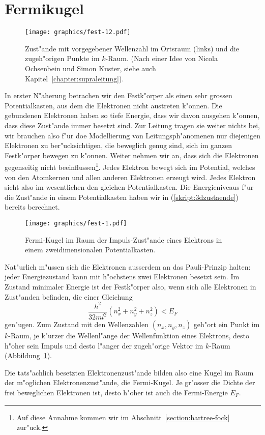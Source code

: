 \section{Fermikugel}
\begin{figure}
\centering
\texttt{[image: graphics/fest-12.pdf]}
\caption{Zust"ande mit vorgegebener Wellenzahl im Ortsraum (links) und
die zugeh"origen Punkte im $k$-Raum.
(Nach einer Idee von Nicola Ochsenbein und Simon Kuster, siehe auch
Kapitel~\ref{chapter:supraleitung}).
\label{skript:kraum}}
\end{figure}
In erster N"aherung betrachen wir den Festk"orper als einen
sehr grossen Potentialkasten, aus dem die Elektronen nicht austreten
k"onnen.
Die gebundenen Elektronen haben so tiefe Energie, dass wir davon
ausgehen k"onnen, dass diese Zust"ande immer besetzt sind.
Zur Leitung tragen sie weiter nichts bei, wir brauchen also f"ur
doe Modellierung von Leitungsph"anomenen nur diejenigen Elektronen
zu ber"ucksichtigen, die beweglich genug sind, sich im ganzen
Festk"orper bewegen zu k"onnen.
Weiter nehmen wir an, dass sich die Elektronen gegenseitig 
nicht beeinflussen\footnote{Auf diese Annahme kommen wir im
Abschnitt~\ref{section:hartree-fock} zur"uck.}.
Jedes Elektron bewegt sich im Potential, welches von den Atomkernen
und allen anderen Elektronen erzeugt wird.
Jedes Elektron sieht also im wesentlichen den gleichen Potentialkasten.
Die Energieniveaus f"ur die Zust"ande in einem Potentialkasten haben
wir in (\ref{skript:3dzustaende}) bereits berechnet.
\begin{figure}
\centering
\texttt{[image: graphics/fest-1.pdf]}
\caption{Fermi-Kugel im Raum der Impuls-Zust"ande eines Elektrons in einem
zweidimensionalen Potentialkasten.
\label{skript:fermi-kugel}}
\end{figure}
Nat"urlich m"ussen sich die Elektronen ausserdem an das Pauli-Prinzip
halten: jeder Energiezustand kann mit h"ochstens zwei Elektronen
besetzt sein. 
Im Zustand minimaler Energie ist der Festk"orper also, wenn sich
alle Elektronen in Zust"anden befinden, die einer Gleichung
\[
\frac{h^2}{32ml^2}(
n_x^2
+
n_y^2
+
n_z^2
)
<
E_F
\]
gen"ugen.
Zum Zustand mit den Wellenzahlen $(n_x,n_y,n_z)$ geh"ort ein Punkt
im $k$-Raum, je k"urzer die Wellenl"ange der Wellenfunktion eines
Elektrons, desto h"oher sein Impuls und desto l"anger der zugeh"orige
Vektor im $k$-Raum (Abbildung~\ref{skript:kraum}).

Die tats"achlich besetzten Elektronenzust"ande bilden also eine Kugel
im Raum der m"oglichen Elektronenzust"ande, die Fermi-Kugel.
Je gr"osser die Dichte der frei beweglichen Elektronen ist, desto
h"oher ist auch die Fermi-Energie $E_F$.

